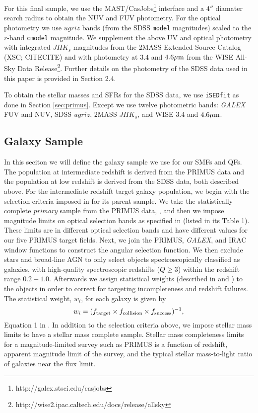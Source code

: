\documentclass{emulateapj}
\begin{document}
For this final sample, we use the MAST/CasJobs\footnote{http://galex.stsci.edu/casjobs} interface and a $4''$ diamater search radius to obtain the NUV and FUV photometry. 
For the optical photometry we use $ugriz$ bands (from the SDSS \texttt{model} magnitudes) scaled to the $r$-band \texttt{cmodel} magnitude. 
We supplement the above UV and optical photometry with integrated $JHK_s$ magnitudes from the 2MASS Extended Source Catalog (XSC; CITECITE) and with photometry at $3.4$ 
and $4.6 \mu \rm{m}$ from the WISE All-Sky Data Release\footnote{http://wise2.ipac.caltech.edu/docs/release/allsky}. 
Further details on the photometry of the SDSS data used in this paper is provided in \cite{Moustakas:2013aa} Section 2.4. 

To obtain the stellar masses and SFRs for the SDSS data, we use \texttt{iSEDfit} as done in Section \ref{sec:primus}. 
Except we use twelve photometric bands: {\em GALEX} FUV and NUV, SDSS $ugriz$, 2MASS $JHK_{s}$, and WISE $3.4$ and $4.6 \mu \rm{m}$. 

\subsection{Galaxy Sample} \label{sec:target} 
In this seciton we will define the galaxy sample we use for our SMFs and QFs.
The population at intermediate redshift is derived from the PRIMUS data and the population at low redshift is derived from the SDSS data, both described above.
For the intermediate redshift target galaxy population, we begin with the selection criteria imposed in \cite{Moustakas:2013aa} for its parent sample.
We take the statistically complete {\em primary} sample from the PRIMUS data, \cite{Coil:2011aa}, and then we impose magnitude limits on optical selection bands as specified in 
\cite{Moustakas:2013aa} (listed in its Table 1).
These limits are in different optical selection bands and have different values for our five PRIMUS target fields.
Next, we join the PRIMUS, {\em GALEX}, and IRAC window functions to construct the angular selection function.
We then exclude stars and broad-line AGN to only select objects spectroscopically classified as galaxies, with high-quality spectroscopic redshifts ($Q \geq 3$) within the 
redshift range $0.2 - 1.0$.
Afterwards we assign statistical weights (described in \cite{Coil:2011aa} and \cite{Cool:2013aa}) to the objects in order to correct for targeting incompleteness and redshift 
failures.
The statistical weight, $w_i$, for each galaxy is given by
\begin{equation}
w_{i} = (f_{\rm{target}} \times f_{\rm{collision}} \times f_{\rm{success}})^{-1},
\end{equation}
Equation 1 in \cite{Moustakas:2013aa}.
In addition to the selection criteria above, we impose stellar mass limits to have a stellar mass complete sample.  
Stellar mass completeness limits for a magnitude-limited survey such as PRIMUS is a function of redshift, apparent magnitude limit of the survey, and the typical stellar 
mass-to-light ratio of galaxies near the flux limit.
\end{document}

